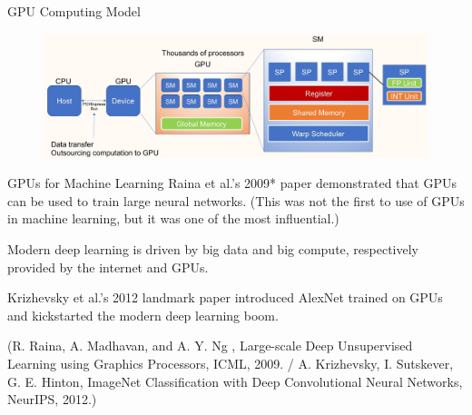 \begin{frame}[allowframebreaks]

\begin{myconceptblock}{4.14}{GPU Computing Model}
    \begin{figure}[H]
        \centering
        \includegraphics[width=1.0\textwidth]{.././assets/4.7.jpg}
    \end{figure}
\end{myconceptblock}

\end{frame}

\begin{frame}[allowframebreaks]

\begin{myconceptblock}{4.15}{GPUs for Machine Learning}
    Raina et al.'s 2009* paper demonstrated that GPUs can be used to train large neural networks. (This was not the first to use of GPUs in machine learning, but it was one of the most influential.)

    Modern deep learning is driven by big data and big compute, respectively provided by the internet and GPUs.

    Krizhevsky et al.'s 2012 landmark paper introduced AlexNet trained on GPUs and kickstarted the modern deep learning boom.

    (R. Raina, A. Madhavan, and A. Y. Ng , Large-scale Deep Unsupervised Learning using Graphics Processors, ICML, 2009. / 
    A. Krizhevsky, I. Sutskever, G. E. Hinton, ImageNet Classification with Deep Convolutional Neural Networks, NeurIPS, 2012.)
\end{myconceptblock}

\end{frame}


